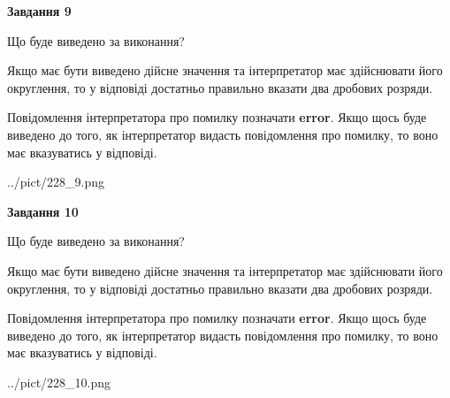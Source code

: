 \documentclass[12pt, ukrainian]{article}
\begin{document}
{\begin {Large}
{\begin {center}\textbf{Завдання 9}\end {center}}\par
Що буде виведено за виконання? \par

Якщо має бути виведено дійсне значення та інтерпретатор має здійснювати його округлення, 
то у відповіді достатньо правильно вказати два дробових розряди.

Повідомлення інтерпретатора про помилку позначати \textbf{error}.
Якщо щось буде виведено до того, як інтерпретатор видасть повідомлення про помилку, 
то воно має вказуватись у відповіді. \par

\begin{center}
	{../pict/228_9.png}
\end{center}
\newpage

{\begin {center}\textbf{Завдання 10}\end {center}}\par
Що буде виведено за виконання? \par

Якщо має бути виведено дійсне значення та інтерпретатор має здійснювати його округлення, 
то у відповіді достатньо правильно вказати два дробових розряди.

Повідомлення інтерпретатора про помилку позначати \textbf{error}.
Якщо щось буде виведено до того, як інтерпретатор видасть повідомлення про помилку, 
то воно має вказуватись у відповіді. \par

\begin{center}
	{../pict/228_10.png}
\end{center}
\newpage

\end {Large}}
\end{document}
